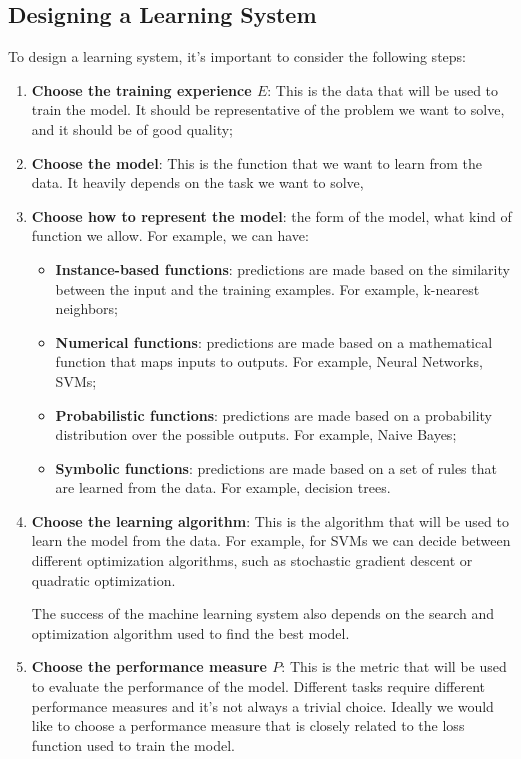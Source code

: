 \subsection{Designing a Learning System}
To design a learning system, it's important to consider the following steps:
\begin{enumerate}
    \item \textbf{Choose the training experience $E$}: This is the data that will be used to train the model.
    It should be representative of the problem we want to solve, and it should be of good quality;
    \item \textbf{Choose the model}: This is the function that we want to learn from the data.
    It heavily depends on the task we want to solve,
    \item \textbf{Choose how to represent the model}: the form of the model, what kind of function we allow. For example, we can have:
    \begin{itemize}
        \item \textbf{Instance-based functions}: predictions are made based on the similarity between the input and the training examples. For example, k-nearest neighbors;
        \item \textbf{Numerical functions}: predictions are made based on a mathematical function that maps inputs to outputs. For example, Neural Networks, SVMs;
        \item \textbf{Probabilistic functions}: predictions are made based on a probability distribution over the possible outputs. For example, Naive Bayes;
        \item \textbf{Symbolic functions}: predictions are made based on a set of rules that are learned from the data. For example, decision trees.
    \end{itemize}
    \item \textbf{Choose the learning algorithm}: This is the algorithm that will be used to learn the model from the data.
    For example, for SVMs we can decide between different optimization algorithms, such as stochastic gradient descent or
    quadratic optimization.

    The success of the machine learning system also depends on the search and optimization algorithm used to find the best model.
    \item \textbf{Choose the performance measure $P$}: This is the metric that will be used to evaluate the performance of the model.
    Different tasks require different performance measures and it's not always a trivial choice. Ideally we would like to choose a performance measure that is closely related
    to the loss function used to train the model.
\end{enumerate}

